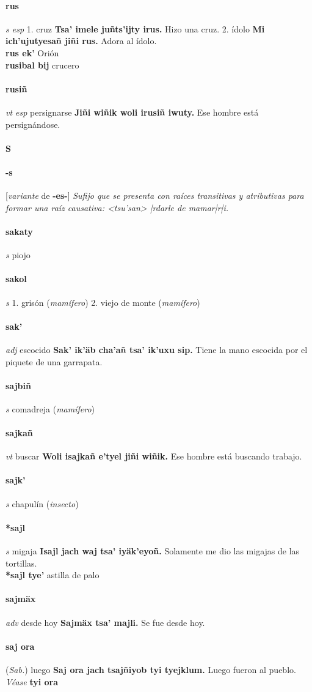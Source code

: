 \documentclass{scrbook}
\newcommand{\entry}[1]{\paragraph{#1}}
\newcommand{\alphaletter}[1]{\addsec{#1}}
\newcommand{\onedefinition}[1]{#1.}
\newcommand{\nontranslationdef}[1]{\textit{#1}}
\newcommand{\partofspeech}[1]{\textit{#1}}
\newcommand{\spanishtranslation}[1]{#1}
\newcommand{\clarification}[1]{(\textit{#1})}
\newcommand{\cholexample}[1]{\textbf{#1}}
\newcommand{\exampletranslation}[1]{#1}
\newcommand{\alsosee}[1]{\\\textit{Véase} \textbf{#1}}
\newcommand{\relevantdialect}[1]{(\textit{#1})}
\newcommand{\secondaryentry}[1]{\\\textbf{#1}}
\newcommand{\secondtranslation}[1]{#1}
\newcommand{\conjugationtense}[1]{[\textit{#1}}
\newcommand{\conjugationverb}[1]{de \textbf{#1}]}
\begin{document}
\begin{multicols}{2}
\entry{rus}
\partofspeech{s esp}
\onedefinition{1}
\spanishtranslation{cruz}
\cholexample{Tsa' imele juñts'ijty irus.}
\exampletranslation{Hizo una cruz.}
\onedefinition{2}
\spanishtranslation{ídolo}
\cholexample{Mi ich'ujutyesañ jiñi rus.}
\exampletranslation{Adora al ídolo.}
\secondaryentry{rus ek'}
\secondtranslation{Orión}
\secondaryentry{rusibal bij}
\secondtranslation{crucero}

\entry{rusiñ}
\partofspeech{vt esp}
\spanishtranslation{persignarse}
\cholexample{Jiñi wiñik woli irusiñ iwuty.}
\exampletranslation{Ese hombre está persignándose.}

\entry{S}
\alphaletter{S}

\entry{-s}
\conjugationtense{variante}
\conjugationverb{-es-}
\nontranslationdef{Sufijo que se presenta con raíces transitivas y atributivas para formar una raíz causativa: <tsu'san> |rdarle de mamar|r|i.}

\entry{sakaty}
\partofspeech{s}
\spanishtranslation{piojo}

\entry{sakol}
\partofspeech{s}
\onedefinition{1}
\spanishtranslation{grisón}
\clarification{mamífero}
\onedefinition{2}
\spanishtranslation{viejo de monte}
\clarification{mamífero}

\entry{sak'}
\partofspeech{adj}
\spanishtranslation{escocido}
\cholexample{Sak' ik'äb cha'añ tsa' ik'uxu sip.}
\exampletranslation{Tiene la mano escocida por el piquete de una garrapata.}

\entry{sajbiñ}
\partofspeech{s}
\spanishtranslation{comadreja}
\clarification{mamífero}

\entry{sajkañ}
\partofspeech{vt}
\spanishtranslation{buscar}
\cholexample{Woli isajkañ e'tyel jiñi wiñik.}
\exampletranslation{Ese hombre está buscando trabajo.}

\entry{sajk'}
\partofspeech{s}
\spanishtranslation{chapulín}
\clarification{insecto}

\entry{*sajl}
\partofspeech{s}
\spanishtranslation{migaja}
\cholexample{Isajl jach waj tsa' iyäk'eyoñ.}
\exampletranslation{Solamente me dio las migajas de las tortillas.}
\secondaryentry{*sajl tye'}
\secondtranslation{astilla de palo}

\entry{sajmäx}
\partofspeech{adv}
\spanishtranslation{desde hoy}
\cholexample{Sajmäx tsa' majli.}
\exampletranslation{Se fue desde hoy.}

\entry{saj ora}
\relevantdialect{Sab.}
\spanishtranslation{luego}
\cholexample{Saj ora jach tsajñiyob tyi tyejklum.}
\exampletranslation{Luego fueron al pueblo.}
\alsosee{tyi ora}


\end{multicols}
\end{document}
